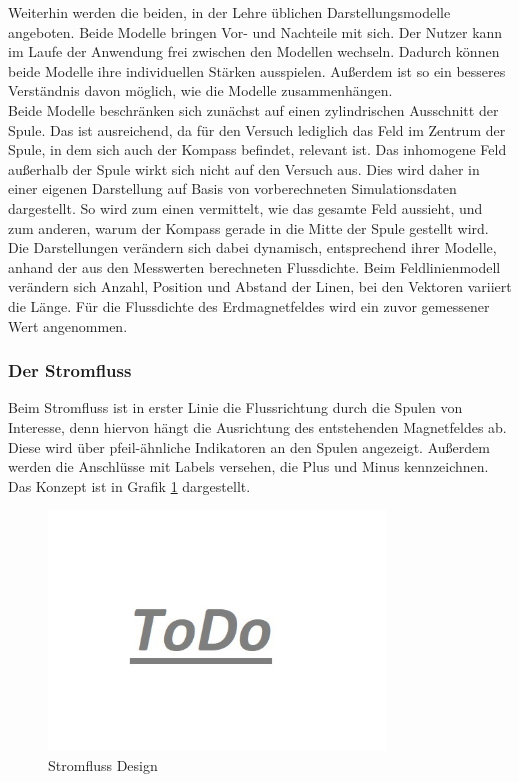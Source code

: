Weiterhin werden die beiden, in der Lehre üblichen Darstellungsmodelle angeboten. Beide Modelle bringen Vor- und Nachteile mit sich. Der Nutzer kann im Laufe der Anwendung frei zwischen den Modellen wechseln. Dadurch können beide Modelle ihre individuellen Stärken ausspielen. Außerdem ist so ein besseres Verständnis davon möglich, wie die Modelle zusammenhängen.\\

Beide Modelle beschränken sich zunächst auf einen zylindrischen Ausschnitt der Spule. Das ist ausreichend, da für den Versuch lediglich das Feld im Zentrum der Spule, in dem sich auch der Kompass befindet, relevant ist. Das inhomogene Feld außerhalb der Spule wirkt sich nicht auf den Versuch aus. Dies wird daher in einer eigenen Darstellung auf Basis von vorberechneten Simulationsdaten dargestellt. So wird zum einen vermittelt, wie das gesamte Feld aussieht, und zum anderen, warum der Kompass gerade in die Mitte der Spule gestellt wird.\\

Die Darstellungen verändern sich dabei dynamisch, entsprechend ihrer Modelle, anhand der aus den Messwerten berechneten Flussdichte. Beim Feldlinienmodell verändern sich Anzahl, Position und Abstand der Linen, bei den Vektoren variiert die Länge. Für die Flussdichte des Erdmagnetfeldes wird ein zuvor gemessener Wert angenommen.\\

\subsubsection{Der Stromfluss} %
Beim Stromfluss ist in erster Linie die Flussrichtung durch die Spulen von Interesse, denn hiervon hängt die Ausrichtung des entstehenden Magnetfeldes ab. Diese wird über pfeil-ähnliche Indikatoren an den Spulen angezeigt. Außerdem werden die Anschlüsse mit Labels versehen, die Plus und Minus kennzeichnen. Das Konzept ist in Grafik \ref{img:current-design} dargestellt.

\begin{figure}[h!]
	\centering
	\includegraphics[width=0.8\textwidth]{images/todo.jpg}
	\caption{Stromfluss Design}
	\label{img:current-design}
\end{figure}


